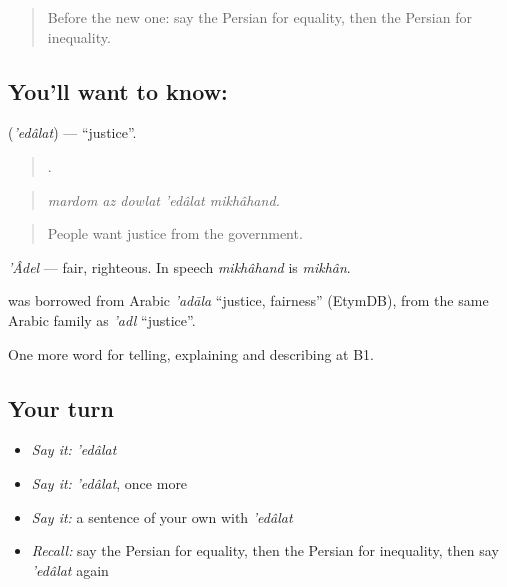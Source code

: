 \label{lesson:FA-C386-edalat}



\begin{quote}
Before the new one: say the Persian for equality, then the Persian for inequality.
\end{quote}

\subsection*{You'll want to know: }
\textbf{} (\emph{'edâlat}) — \textquotedblleft{}justice\textquotedblright{}.

\begin{quote}
    .
\end{quote}

\begin{quote}
\emph{mardom az dowlat 'edâlat mikhâhand.}
\end{quote}

\begin{quote}
People want justice from the government.
\end{quote}

\emph{'Âdel} — fair, righteous. In speech \emph{mikhâhand} is \emph{mikhân}.

\begin{cousinweb}
\textbf{} was borrowed from Arabic \emph{'adāla} \textquotedblleft{}justice, fairness\textquotedblright{} (EtymDB), from the same Arabic family as \emph{'adl} \textquotedblleft{}justice\textquotedblright{}.
\end{cousinweb}

\begin{grammarlens}[title={What you've built}]
One more word for telling, explaining and describing at B1.
\end{grammarlens}

\subsection*{Your turn}
\begin{itemize}
\raggedright
  \item \emph{Say it:} \emph{'edâlat}
  \item \emph{Say it:} \emph{'edâlat}, once more
  \item \emph{Say it:} a sentence of your own with \emph{'edâlat}
  \item \emph{Recall:} say the Persian for equality, then the Persian for inequality, then say \emph{'edâlat} again
\end{itemize}

